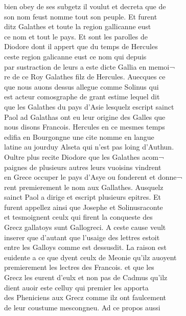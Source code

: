 \documentclass[12pt]{article}
\begin{document}
\newpage




bien obey de ses subgetz il voulut et decreta que de\\
son nom feust
          nomme tout son peuple. Et furent\\
ditz Galathes et toute la region gallicanne
            eust\\
ce nom et tout le pays. Et sont les parolles de\\
Diodore dont il appert que du temps de Hercules\\
ceste region galicanne eust ce nom
          qui depuis\\
par sustraction de leurs a este dicte Gallia en memoi¬\\
re
          de ce Roy Galathes filz de Hercules. Auecques ce\\
que nous auons dessus
          allegue comme Solinus
            qui\\
est acteur comosgraphe de grant estime lequel dit\\
que les
          Galathes du pays d'Asie lesquelz escript sainct\\
Paol ad Galathas ont eu leur origine des
          Galles que\\
nous disons Francois. Hercules en ce mesmes temps\\
edifia en Bourgongne une cite nomme
          en langue\\
latine au jourduy Alseta qui n'est pas loing d'Authun.\\
Oultre plus recite Diodore que les
          Galathes acom¬\\
paignes de plusieurs autres leurs vuoisins vindrent\\
en Grece occuper le pays d'Asye ou fonderent et donne¬\\
rent premierement le
          nom aux Gallathes. Ausquelz\\
sainct
            Paol a dirige et escript plusieurs epitres. Et\\
furent appellez
          ainsi que Josephe et Solinusraconte\\
et tesmoignent ceulx qui firent la
          conqueste des\\
Grecz gallatoys sunt Gallogreci. A ceste cause veult\\
inserer que d'autant que l'usaige des lettres estoit\\
entre les Galloys comme
          est dessusdit. La raison est\\
euidente a ce que dyent ceulx de Meonie qu'ilz
            auoyent\\
premierement les lectres des Francois. et que les\\
Grecz
          les eurent d'eulx et non pas de Cadmus qu'ilz\\
dient auoir este celluy qui premier les apporta\\
des Pheniciens aux Grecz
          comme ilz ont faulcement\\
de leur coustume mescongneu. Ad ce propos aussi
\end{document}
